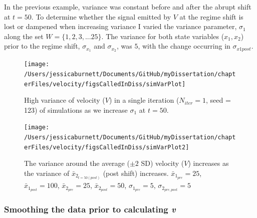 \documentclass[12pt,twoside,openany]{reedthesis}
\begin{document}
In the previous example, variance was constant before and after the abrupt shift at \(t=50\). To determine whether the signal emitted by \(V\) at the regime shift is lost or dampened when increasing variance I varied the variance parameter, \(\sigma_1\) along the set \(W = \{1,2,3,...25 \}\). The variance for both state variables (\(x_1, x_2\)) prior to the regime shift, \(\sigma_{x_1}\) and \(\sigma_{x_2}\), was \(5\), with the change occurring in \(\sigma_{x1post}\).
\begin{figure}[bth]

{\centering \texttt{[image: /Users/jessicaburnett/Documents/GitHub/myDissertation/chapterFiles/velocity/figsCalledInDiss/simVarPlot]} 

}

\caption{High variance of velocity ($V$) in a single iteration ($N_{iter}=1$, seed = 123) of simulations as we increase $\sigma_1$ at $t=50$.}\label{fig:simVarPlot}
\end{figure}
\begin{figure}[bth]

{\centering \texttt{[image: /Users/jessicaburnett/Documents/GitHub/myDissertation/chapterFiles/velocity/figsCalledInDiss/simVarPlot2]} 

}

\caption{The variance around the average ($\pm2$ SD) velocity ($V$) increases as the variance of $\bar{x}_{2_{t=50 (post)}}$ (post shift) increases. $\bar{x}_{1_{pre}} = 25$, $\bar{x}_{1_{post}} = 100$, $\bar{x}_{2_{pre}} = 25$, $\bar{x}_{2_{post}} = 50$, $\sigma_{1_{pre}} = 5$, $\sigma_{2_{pre,post}} = 5$}\label{fig:simVarPlot2}
\end{figure}
\hypertarget{smoothing-the-data-prior-to-calculating-v}{%
\subsubsection{\texorpdfstring{Smoothing the data prior to calculating \emph{v}}{Smoothing the data prior to calculating v}}\label{smoothing-the-data-prior-to-calculating-v}}
\end{document}
